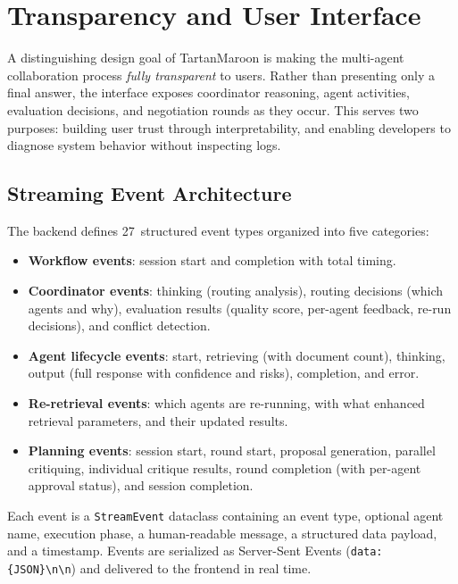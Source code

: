 \section{Transparency and User Interface}

A distinguishing design goal of TartanMaroon is making the multi-agent collaboration process \emph{fully transparent} to users. Rather than presenting only a final answer, the interface exposes coordinator reasoning, agent activities, evaluation decisions, and negotiation rounds as they occur. This serves two purposes: building user trust through interpretability, and enabling developers to diagnose system behavior without inspecting logs.

\subsection{Streaming Event Architecture}

The backend defines 27~structured event types organized into five categories:

\begin{itemize}
    \item \textbf{Workflow events}: session start and completion with total timing.
    \item \textbf{Coordinator events}: thinking (routing analysis), routing decisions (which agents and why), evaluation results (quality score, per-agent feedback, re-run decisions), and conflict detection.
    \item \textbf{Agent lifecycle events}: start, retrieving (with document count), thinking, output (full response with confidence and risks), completion, and error.
    \item \textbf{Re-retrieval events}: which agents are re-running, with what enhanced retrieval parameters, and their updated results.
    \item \textbf{Planning events}: session start, round start, proposal generation, parallel critiquing, individual critique results, round completion (with per-agent approval status), and session completion.
\end{itemize}

Each event is a \texttt{StreamEvent} dataclass containing an event type, optional agent name, execution phase, a human-readable message, a structured data payload, and a timestamp. Events are serialized as Server-Sent Events (\texttt{data: \{JSON\}\textbackslash n\textbackslash n}) and delivered to the frontend in real time.

